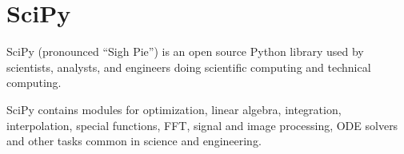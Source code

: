 \documentclass[Pydata.tex]{subfiles}
\begin{document}
 

\section{SciPy}
 
 
\item SciPy (pronounced “Sigh Pie”) is an open source Python library used by scientists, analysts, and engineers doing scientific computing and technical computing.

\item SciPy contains modules for optimization, linear algebra, integration, interpolation, special functions, FFT, signal and image processing, ODE solvers and other tasks common in science and engineering.
 
%  
\end{document}
